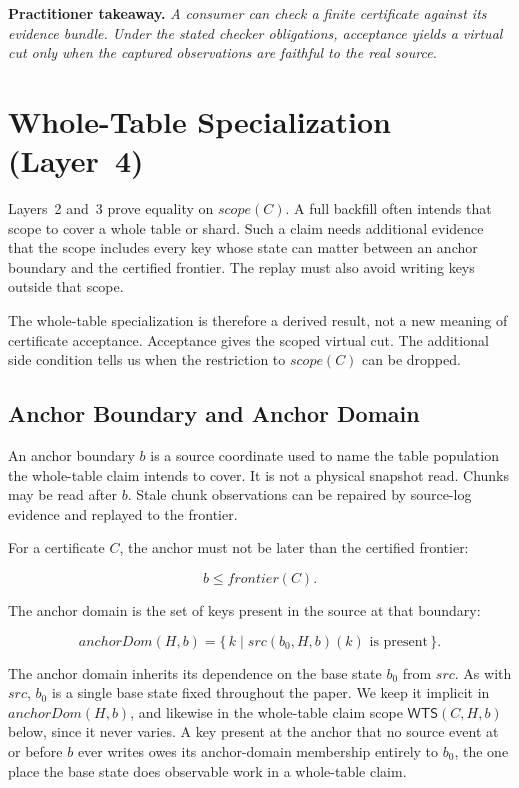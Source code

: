 \documentclass[letterpaper,10pt,twocolumn]{article}
\newcommand{\Src}{\mathit{src}}
\newcommand{\Scope}{\mathit{scope}}
\newcommand{\Frontier}{\mathit{frontier}}
\newcommand{\AnchorDomain}{\mathit{anchorDom}}
\newcommand{\WTS}{\mathsf{WTS}}
\begin{document}
\smallskip
\noindent\textbf{Practitioner takeaway.} \emph{A consumer can check a
finite certificate against its evidence bundle. Under the stated
checker obligations, acceptance yields a virtual cut only when the
captured observations are faithful to the real source.}

\section{Whole-Table Specialization \mbox{(Layer 4)}}\label{whole-table-specialization-layer-4}

Layers~2 and~3 prove equality on $\Scope(C)$. A full backfill often
intends that scope to cover a whole table or shard. Such a claim needs
additional evidence that the scope includes every key whose state can
matter between an anchor boundary and the certified frontier. The
replay must also avoid writing keys outside that scope.

The whole-table specialization is therefore a derived result, not a new
meaning of certificate acceptance. Acceptance gives the scoped virtual
cut. The additional side condition tells us when the restriction to
$\Scope(C)$ can be dropped.

\subsection{Anchor Boundary and Anchor
Domain}\label{anchor-boundary-and-anchor-domain}

An anchor boundary $b$ is a source coordinate used to name the
table population the whole-table claim intends to cover. It is not a
physical snapshot read. Chunks may be read after $b$. Stale chunk observations can
be repaired by source-log evidence and replayed to the frontier.

For a certificate $C$, the anchor must not be later than the
certified frontier:

\[
b \le \Frontier(C).
\]

The anchor domain is the set of keys present in the source at that
boundary:

\[
  \AnchorDomain(H,b)
    = \{\,k \mid \Src(b_0,H,b)(k) \text{ is present}\,\}.
\]

The anchor domain inherits its dependence on the base state $b_0$ from
$\Src$. As with $\Src$, $b_0$ is a single base state fixed throughout the
paper. We keep it implicit in $\AnchorDomain(H,b)$, and likewise in the
whole-table claim scope $\WTS(C,H,b)$ below, since it never varies. A
key present at the anchor that no source event at or before $b$ ever
writes owes its anchor-domain membership entirely to $b_0$, the one
place the base state does observable work in a whole-table claim.
\end{document}
